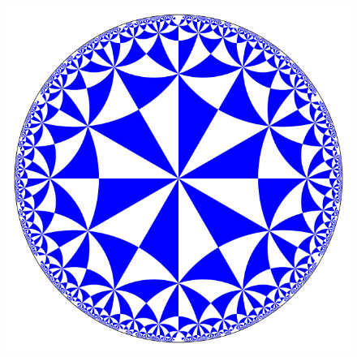 \begin{figure}
        \label{fig:hyper_after}
        \includegraphics[width=0.85\columnwidth]{../images/wiki_hyperbolic.png}
        \label{fig:hyper_tiling}
    \end{figure}

